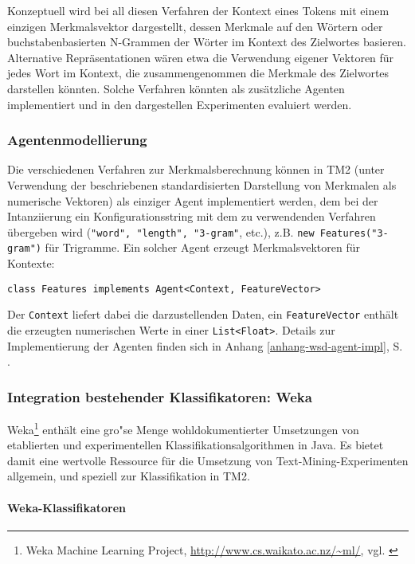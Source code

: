 \documentclass[abstracton, 12pt]{scrartcl}
\begin{document}
Konzeptuell wird bei all diesen Verfahren der Kontext eines Tokens mit einem einzigen Merkmalsvektor dargestellt, dessen Merkmale auf den Wörtern oder buchstabenbasierten N-Grammen der Wörter im Kontext des Zielwortes basieren. Alternative Repräsentationen wären etwa die Verwendung eigener Vektoren für jedes Wort im Kontext, die zusammengenommen die Merkmale des Zielwortes darstellen könnten. Solche Verfahren könnten als zusätzliche Agenten implementiert und in den dargestellen Experimenten evaluiert werden.

\subsubsection{Agentenmodellierung} 

Die verschiedenen Verfahren zur Merkmalsberechnung können in TM2 (unter Verwendung der beschriebenen standardisierten Darstellung von Merkmalen als numerische Vektoren) als einziger Agent implementiert werden, dem bei der Intanziierung ein Konfigurations\-string mit dem zu verwendenden Verfahren übergeben wird (\lstinline!"word", "length", "3-gram"!, etc.), z.B. \lstinline!new Features("3-gram")! für Trigramme. Ein solcher Agent erzeugt Merkmalsvektoren für Kontexte:

\begin{lstlisting}
class Features implements Agent<Context, FeatureVector>
\end{lstlisting}

Der \lstinline!Context! liefert dabei die darzustellenden Daten, ein \lstinline!FeatureVector! enthält die erzeugten numerischen Werte in einer \lstinline!List<Float>!. Details zur Implementierung der Agenten finden sich in Anhang \ref{anhang-wsd-agent-impl}, S. \pageref{anhang-wsd-agent-impl}.

\subsubsection{Integration bestehender Klassifikatoren: Weka} \label{appl-weka}

Weka\footnote{Weka Machine Learning Project, \url{http://www.cs.waikato.ac.nz/~ml/}, vgl. \citet{WittenAndFrank2000}} enthält eine gro"se Menge wohldokumentierter Umsetzungen von etablierten und experimentellen Klassifikationsalgorithmen in Java. Es bietet damit eine wertvolle Ressource für die Umsetzung von Text-Mining-Experimenten allgemein, und speziell zur Klassifikation in TM2.

\paragraph{Weka-Klassifikatoren}
\end{document}

